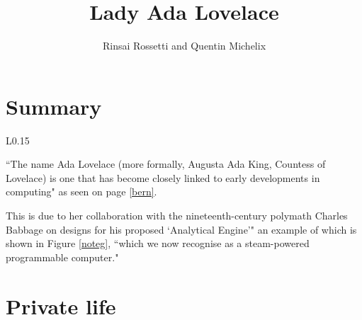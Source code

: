 \documentclass[12pt, xcolor=dvipsnames]{beamer}
\author{Rinsai Rossetti and Quentin Michelix}
\title{\textbf{Lady Ada Lovelace}}
\date{}
\begin{document}
\titlepage




\begin{frame}

\begin{leftbar}

\tableofcontents

\end{leftbar}

\end{frame}

\section{Summary}

\begin{frame} 
\begin{center} 
{\bf \secname} 
\end{center}

\begin{wrapfigure}{L}{0.15\textwidth}
\end{wrapfigure}

``The name Ada Lovelace (more formally, Augusta Ada King, Countess of Lovelace) is one that has become closely linked to early developments in computing" as seen on page \ref{bern}. 

This is due to her collaboration with the nineteenth-century polymath Charles Babbage on designs for his proposed ‘Analytical Engine’" an example of which is shown in Figure \ref{noteg}, ``which we now recognise as a steam-powered programmable computer." \cite{sciencefocus} \cite{sciencefocusadapted}

\end{frame}


\section{Private life}
\end{document}
